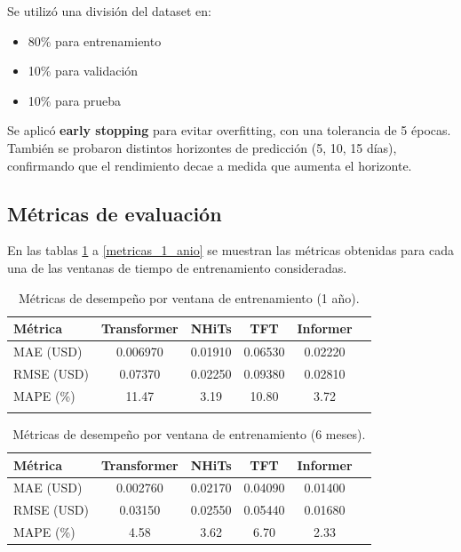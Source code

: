 \documentclass[12pt]{article}
\begin{document}
Se utilizó una división del dataset en:
\begin{itemize}
\item 80\% para entrenamiento
\item 10\% para validación
\item 10\% para prueba
\end{itemize}

Se aplicó \textbf{early stopping} para evitar overfitting, con una tolerancia de 5 épocas. También se probaron distintos horizontes de predicción (5, 10, 15 días), confirmando que el rendimiento decae a medida que aumenta el horizonte.

\bigskip
\subsection{Métricas de evaluación}

En las tablas \ref{metricas_3_meses} a  \ref{metricas_1_anio} se muestran las métricas obtenidas para cada una de las ventanas de tiempo de entrenamiento consideradas.

\begin{table}[H]
\centering
\caption{Métricas de desempeño por ventana de entrenamiento (1 año).}
\begin{tabular}{lccccc}
\toprule
\textbf{Métrica} & \textbf{Transformer} & \textbf{NHiTs} & \textbf{TFT} & \textbf{Informer} \\ 
\midrule
MAE (USD)  & 0.006970 & 0.01910 & 0.06530 & 0.02220 \\
RMSE (USD) & 0.07370 & 0.02250 & 0.09380 & 0.02810 \\
MAPE (\%)  & 11.47 & 3.19 & 10.80 & 3.72 \\
\bottomrule
\label{metricas_3_meses}
\end{tabular}
\end{table}

\begin{table}[H]
\centering
\caption{Métricas de desempeño por ventana de entrenamiento (6 meses).}
\begin{tabular}{lccccc}
\toprule
\textbf{Métrica} & \textbf{Transformer} & \textbf{NHiTs} & \textbf{TFT} & \textbf{Informer} \\ 
\midrule
MAE (USD)  & 0.002760 & 0.02170 & 0.04090 & 0.01400 \\
RMSE (USD) & 0.03150 & 0.02550 & 0.05440 & 0.01680 \\
MAPE (\%)  & 4.58 & 3.62 & 6.70 & 2.33 \\
\bottomrule
\end{tabular}
\label{metricas_6_meses}
\end{table}
\end{document}
